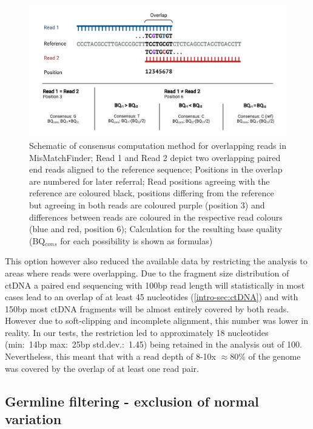 \begin{figure}[!ht]
\centering
\includegraphics[width=.99\linewidth]{Figures/MisMatchFinder/ConsensusMethodMisMatchFinder.pdf}
\caption[Schematic of consensus computation method for overlapping reads]{Schematic of consensus computation method for overlapping reads in MisMatchFinder; Read 1 and Read 2 depict two overlapping paired end reads aligned to the reference sequence; Positions in the overlap are numbered for later referral; Read positions agreeing with the reference are coloured black, positions differing from the reference but agreeing in both reads are coloured purple (position 3) and differences between reads are coloured in the respective read colours (blue and red, position 6); Calculation for the resulting base quality (BQ$_{cons}$ for each possibility is shown as formulas)}\label{fig:mmf-consensus}
\end{figure}

This option however also reduced the available data by restricting the analysis to areas where reads were overlapping. Due to the fragment size distribution of ctDNA a paired end sequencing with 100bp read length will statistically in most cases lead to an overlap of at least 45 nucleotides (\autoref{intro-sec:ctDNA}) and with 150bp most ctDNA fragments will be almost entirely covered by both reads. However due to soft-clipping and incomplete alignment, this number was lower in reality.
In our tests, the restriction led to approximately 18 nucleotides (min:~14bp max:~25bp std.dev.:~1.45) being retained in the analysis out of 100. Nevertheless, this meant that with a read depth of 8-10x $\approx$80\% of the genome was covered by the overlap of at least one read pair.



\subsection[Germline filtering]{Germline filtering - exclusion of normal variation}
\label{mmf-sec:germline}

